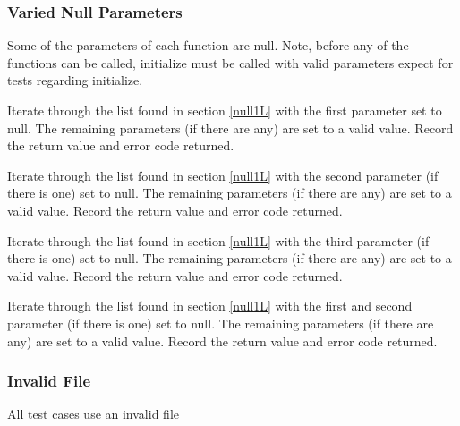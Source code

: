 \documentclass[12pt]{article} %
\begin{document}
\subsubsection{Varied Null Parameters}
Some of the parameters of each function are null.  Note, before any of the functions can be called, initialize must be called with valid parameters expect for tests regarding
initialize.

\begin{list}{.}{}
\item Iterate through the list found in section \ref{null1L} with the first parameter set to null.  The remaining parameters (if there are any) are set to a valid value.
Record the return value and error code returned.
\item Iterate through the list found in section \ref{null1L} with the second parameter (if there is one)  set to null.  The remaining parameters (if there are any) are set to a valid value.  Record the return value and error code returned.
\item Iterate through the list found in section \ref{null1L} with the third parameter (if there is one) set to null.  The remaining parameters (if there are any) are set to a valid value. Record the return value and error code returned.
\item Iterate through the list found in section \ref{null1L} with the first and second parameter (if there is one) set to null.  The remaining parameters (if there are any) are set to a valid value.  Record the return value and error code returned.
\end{list}

\subsubsection{Invalid File}
All test cases use an invalid file
\end{document}

